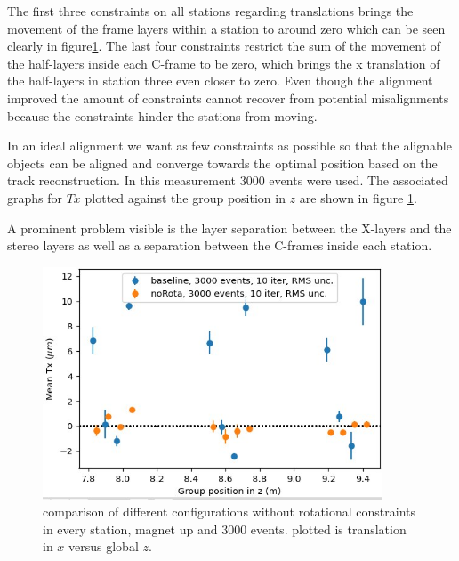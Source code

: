 The first three constraints on all stations regarding translations brings the movement of the frame layers within a station to around zero which can be seen clearly in figure\ref{fig:june_2}. The last four constraints restrict the sum of the movement of the half-layers inside each C-frame to be zero, which brings the x translation of the half-layers in station three even closer to zero.
Even though the alignment improved the amount of constraints cannot recover from potential misalignments because the constraints hinder the stations from moving.

In an ideal alignment we want as few constraints as possible so that the alignable objects can be aligned and converge towards the optimal position based on the track reconstruction.
In this measurement 3000 events were used. The associated graphs for $Tx$ plotted against the group position in $z$ are shown in figure \ref{fig:june_2}.

A prominent problem visible is the layer separation between the X-layers and the stereo layers as well as a separation between the C-frames inside each station.

\begin{figure}
  \centering
  \includegraphics[width=0.9\textwidth]{plots/renewed_plots/lxplus/4_3.jpeg}
  \caption{comparison of different configurations without rotational constraints in every station, magnet up and 3000 events. plotted is translation in $x$ versus global $z$.}
  \label{fig:june_2}
\end{figure}

